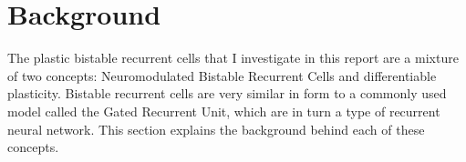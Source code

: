 \section{Background}

The plastic bistable recurrent cells that I investigate in this report are a mixture of two concepts: Neuromodulated Bistable Recurrent Cells\cite{vecoven2021brc} and differentiable plasticity\cite{miconi2018diffplas}. Bistable recurrent cells are very similar in form to a commonly used model called the Gated Recurrent Unit\cite{cho2014gru}, which are in turn a type of recurrent neural network. This section explains the background behind each of these concepts.




